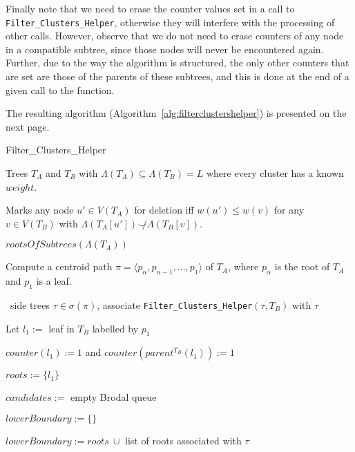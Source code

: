 \documentclass{article}
\newcommand{\compatible}{\smile}
\newcommand{\leafset}{\Lambda}
\begin{document}
    Finally note that we need to erase the counter values set in a call to \texttt{Filter\_Clusters\_Helper}, otherwise they will interfere with the processing of other calls. However, observe that we do not need to erase counters of any node in a compatible subtree, since those nodes will never be encountered again. Further, due to the way the algorithm is structured, the only other counters that are set are those of the parents of these subtrees, and this is done at the end of a given call to the function.

    The resulting algorithm (Algorithm~\ref{alg:filterclustershelper}) is presented on the next page.

    \begin{algorithm}
        \caption{Filter\_Clusters\_Helper}
        \label{alg:filterclustershelper}

        \begin{algorithmic}[1]
            \Input Trees $T_A$ and $T_B$ with $\leafset(T_A) \subseteq \leafset(T_B) = L$ where every cluster has a known $weight$.

            \SideEffect Marks any node $u' \in V(T_A)$ for deletion iff $w(u') \leq w(v)$ for any $v \in V(T_B)$ with $\leafset(T_A[u']) \not\compatible \leafset(T_B[v])$.

            \Output $rootsOfSubtrees(\leafset(T_A))$

            \State Compute a centroid path $\pi = \langle p_{\alpha}, p_{\alpha - 1}, ..., p_1 \rangle$ of $T_A$, where $p_{\alpha}$ is the root of $T_A$ and $p_1$ is a leaf.

            \State \algorithmicforall\ side trees $\tau \in \sigma(\pi)$,
                associate \texttt{Filter\_Clusters\_Helper}$(\tau, T_B)$ with $\tau$

            \State Let $l_1 :=$ leaf in $T_B$ labelled by $p_1$

            \State $counter(l_1) := 1$ and $counter(parent^{T_B}(l_1)) := 1$

            \State $roots := \{l_1\}$

            \State $candidates :=$ empty Brodal queue

                \State $lowerBoundary := \{\}$

                    \State $lowerBoundary := roots\ \cup$ list of roots associated with $\tau$
                \EndFor


\end{algorithmic}
\end{algorithm}
\end{document}
